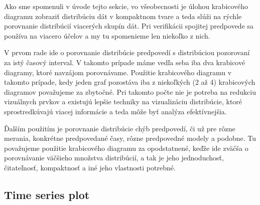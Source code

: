 Ako sme spomenuli v úvode tejto sekcie, vo všeobecnosti je úlohou krabicového diagramu zobraziť distribúciu dát v kompaktnom tvare a teda slúži na rýchle porovnanie distribúcií viacerých skupín dát.
Pri verifikácii spojitej predpovede sa používa na viacero účelov a my tu spomenieme len niekoľko z nich. 

V prvom rade ide o porovnanie distribúcie predpovedí s distribúciou pozorovaní za istý časový interval. V takomto prípade máme vedľa seba iba dva krabicové diagramy, ktoré navzájom porovnávame. Použitie krabicového diagramu v takomto prípade, kedy jeden graf pozostáva iba z niekoľkých (2 až 4) krabicových diagramov považujeme za zbytočné. Pri takomto počte nie je potreba na redukciu vizuálnych prvkov a existujú lepšie techniky na vizualizáciu distribúcie, ktoré sprostredkúvajú viacej informácie a teda môže byť analýza efektívnejšia. 

Ďalším použitím je porovnanie distribúcie chýb predpovedí, či už pre rôzne merania, konkrétne predpovedané časy, rôzne predpovedné modely a podobne. Tu považujeme použitie krabicového diagramu za opodstatnené, keďže ide zväčša o porovnávanie väčšieho množstva distribúcií, a tak je jeho jednoduchosť, čitateľnosť, kompaktnosť a iné jeho vlastnosti potrebné.

\subsection{Time series plot}